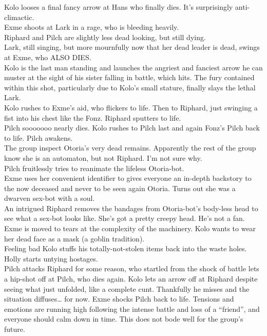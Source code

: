 Kolo looses a final fancy arrow at Hans who finally dies. It’s surprisingly anti-climactic.\\
Exme shoots at Lark in a rage, who is bleeding heavily.\\
Riphard and Pilch are slightly less dead looking, but still dying.\\
Lark, still singing, but more mournfully now that her dead leader is dead, swings at Exme, who ALSO DIES.\\
Kolo is the last man standing and launches the angriest and fanciest arrow he can muster at the sight of his sister falling in battle, which hits. The fury contained within this shot, particularly due to Kolo’s small stature, finally slays the lethal Lark.\\
Kolo rushes to Exme’s aid, who flickers to life. Then to Riphard, just swinging a fist into his chest like the Fonz. Riphard sputters to life.\\
Pilch sooooooo nearly dies. Kolo rushes to Pilch last and again Fonz’s Pilch back to life. Pilch awakens.\\
The group inspect Otoria’s very dead remains. Apparently the rest of the group know she is an automaton, but not Riphard. I’m not sure why.\\
Pilch fruitlessly tries to reanimate the lifeless Otoria-bot.\\
Exme uses her convenient identifier to gives everyone an in-depth backstory to the now deceased and never to be seen again Otoria. Turns out she was a dwarven sex-bot with a soul.\\
An intrigued Riphard removes the bandages from Otoria-bot’s body-less head to see what a sex-bot looks like. She’s got a pretty creepy head. He’s not a fan.\\
Exme is moved to tears at the complexity of the machinery. Kolo wants to wear her dead face as a mask (a goblin tradition).\\
Feeling bad Kolo stuffs his totally-not-stolen items back into the waste holes.\\
Holly starts untying hostages.\\
Pilch attacks Riphard for some reason, who startled from the shock of battle lets a hip-shot off at Pilch, who dies again. Kolo lets an arrow off at Riphard despite seeing what just unfolded, like a complete cunt. Thankfully he misses and the situation diffuses… for now. Exme shocks Pilch back to life. Tensions and emotions are running high following the intense battle and loss of a “friend”, and everyone should calm down in time. This does not bode well for the group’s future.\\
